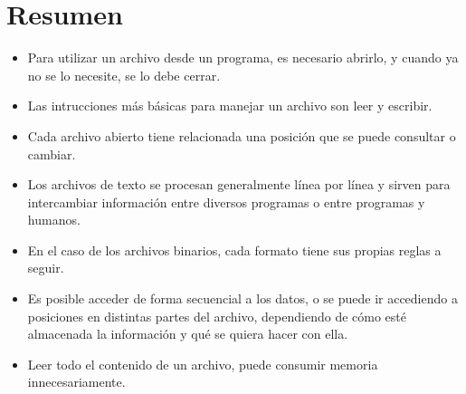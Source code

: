 \section{Resumen}

\begin{itemize}
\item Para utilizar un archivo desde un programa, es necesario abrirlo, y
cuando ya no se lo necesite, se lo debe cerrar.
\item Las intrucciones más básicas para manejar un archivo son leer y escribir.
\item Cada archivo abierto tiene relacionada una posición que se puede
consultar o cambiar.
\item Los archivos de texto se procesan generalmente línea por línea y
sirven para intercambiar información entre diversos programas o entre
programas y humanos.
\item En el caso de los archivos binarios, cada formato tiene sus propias
reglas a seguir.
\item Es posible acceder de forma secuencial a los datos, o se puede ir
accediendo a posiciones en distintas partes del archivo, dependiendo de
cómo esté almacenada la información y qué se quiera hacer con ella.
\item Leer todo el contenido de un archivo, puede consumir memoria
innecesariamente.
\end{itemize}


